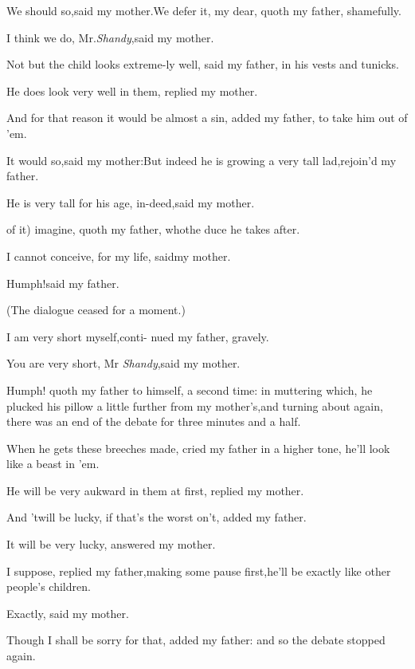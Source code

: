 \documentclass{article}
\begin{document}
We should so,\tsk said my mother.\tsh We defer it, my
dear, quoth my father, shamefully.\tsh

I think we do, Mr.\@ \textit{Shandy},\tsk said my mother.

\tsh Not but the child looks extreme-\break ly well, said my
father, in his vests and tunicks.\tsh{}

\tsh He does look very well in them,\break
\tsk replied my mother.\tsh

\tsh And for that reason it would be almost a sin,
added my father, to take him out of ’em.\tsh

\tsh It would so,\tsk said my
mother:\break\tsh But indeed he is growing a very tall
lad,\tsk rejoin’d my father.

\tsh He is very tall for his age, in-\break deed,\tsk said my
mother.\tsh

\tsk {} of it) imagine,
quoth my father, who\break the duce he takes after.\tsh

I cannot conceive, for my life, said\break my
mother.\tsh{}

Humph!\tsh said my father.

(The dialogue ceased for a moment.)

\tsh I am very short myself,\tsk conti-\break 
nued my father, gravely.

You are very short, Mr \textit{Shandy},\tsk\break said my mother.

Humph! quoth my father to himself, a second time: in muttering
which, he plucked his pillow a little further from my
mother’s,\tsk and turning about again, there was an end of
the debate for three minutes and a half.

\tsh When he gets these breeches made, cried my father
in a higher tone, he’ll look like a beast in ’em.

He will be very aukward in them at first, replied my mother.\tsh

\tsh And ’twill be lucky, if that’s\break
the worst on’t, added my father.

It will be very lucky, answered my mother.

I suppose, replied my father,\tsk making some pause
first,\tsk he’ll be exactly like other people’s
children.\tsh

Exactly, said my mother.\tsh

\tsh Though I shall be sorry for that, added my father:
and so the debate stopped again.
\end{document}
